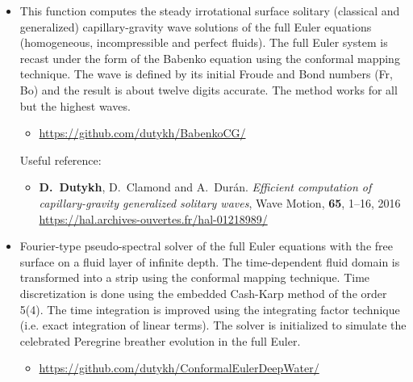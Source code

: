 \documentclass[final, a4paper, oneside, 12pt]{article}
\numberwithin{equation}{section}
\begin{document}
\begin{itemize}

  \item This function computes the steady irrotational surface solitary (classical and generalized) capillary-gravity wave solutions of the full Euler equations (homogeneous, incompressible and perfect fluids). The full Euler system is recast under the form of the Babenko equation using the conformal mapping technique. The wave is defined by its initial Froude and Bond numbers (Fr, Bo) and the result is about twelve digits accurate. The method works for all but the highest waves.
  
  \begin{itemize}
    \item \url{https://github.com/dutykh/BabenkoCG/}
  \end{itemize}
  
  Useful reference:
  \begin{itemize}
    \item \textbf{D.~Dutykh}, D.~Clamond and A.~Dur\'an. \textit{Efficient computation of capillary-gravity generalized solitary waves}, Wave Motion, \textbf{65}, 1--16, 2016 \\
  \url{https://hal.archives-ouvertes.fr/hal-01218989/}
  \end{itemize}

\end{itemize}

\begin{itemize}

  \item Fourier-type pseudo-spectral solver of the full Euler equations with the free surface on a fluid layer of infinite depth. The time-dependent fluid domain is transformed into a strip using the conformal mapping technique. Time discretization is done using the embedded Cash-Karp method of the order 5(4). The time integration is improved using the integrating factor technique (i.e. exact integration of linear terms). The solver is initialized to simulate the celebrated Peregrine breather evolution in the full Euler.
  
  \begin{itemize}
    \item \url{https://github.com/dutykh/ConformalEulerDeepWater/}
  \end{itemize}
  
\end{itemize}
\end{document}
